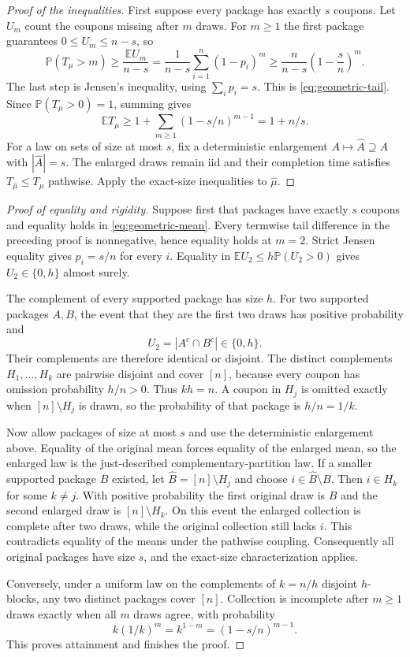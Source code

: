 \documentclass[11pt]{article}
\numberwithin{equation}{section}
\theoremstyle{remark}
\newcommand{\Pp}{\mathbb P}
\newcommand{\E}{\mathbb E}
\newcommand{\1}{\mathbf 1}
\begin{document}
\begin{proof}[Proof of the inequalities]
First suppose every package has exactly $s$ coupons. Let $U_m$ count the coupons missing after $m$ draws. For $m\geq1$ the first package guarantees $0\leq U_m\leq n-s$, so
\[
 \Pp(T_\mu>m)\geq\frac{\E U_m}{n-s}
 =\frac1{n-s}\sum_{i=1}^n(1-p_i)^m
 \geq\frac n{n-s}\left(1-\frac sn\right)^m.
\]
The last step is Jensen's inequality, using $\sum_i p_i=s$. This is \eqref{eq:geometric-tail}. Since $\Pp(T_\mu>0)=1$, summing gives
\[
 \E T_\mu\geq1+\sum_{m\geq1}(1-s/n)^{m-1}=1+n/s.
\]
For a law on sets of size at most $s$, fix a deterministic enlargement $A\mapsto\widehat A\supseteq A$ with $|\widehat A|=s$. The enlarged draws remain iid and their completion time satisfies $T_{\widehat\mu}\leq T_\mu$ pathwise. Apply the exact-size inequalities to $\widehat\mu$.
\end{proof}

\begin{proof}[Proof of equality and rigidity]
Suppose first that packages have exactly $s$ coupons and equality holds in \eqref{eq:geometric-mean}. Every termwise tail difference in the preceding proof is nonnegative, hence equality holds at $m=2$. Strict Jensen equality gives $p_i=s/n$ for every $i$. Equality in $\E U_2\leq h\Pp(U_2>0)$ gives $U_2\in\{0,h\}$ almost surely.

The complement of every supported package has size $h$. For two supported packages $A,B$, the event that they are the first two draws has positive probability and
\[
 U_2=|A^c\cap B^c|\in\{0,h\}.
\]
Their complements are therefore identical or disjoint. The distinct complements $H_1,\ldots,H_k$ are pairwise disjoint and cover $[n]$, because every coupon has omission probability $h/n>0$. Thus $kh=n$. A coupon in $H_j$ is omitted exactly when $[n]\setminus H_j$ is drawn, so the probability of that package is $h/n=1/k$.

Now allow packages of size at most $s$ and use the deterministic enlargement above. Equality of the original mean forces equality of the enlarged mean, so the enlarged law is the just-described complementary-partition law. If a smaller supported package $B$ existed, let $\widehat B=[n]\setminus H_j$ and choose $i\in\widehat B\setminus B$. Then $i\in H_k$ for some $k\ne j$. With positive probability the first original draw is $B$ and the second enlarged draw is $[n]\setminus H_k$. On this event the enlarged collection is complete after two draws, while the original collection still lacks $i$. This contradicts equality of the means under the pathwise coupling. Consequently all original packages have size $s$, and the exact-size characterization applies.

Conversely, under a uniform law on the complements of $k=n/h$ disjoint $h$-blocks, any two distinct packages cover $[n]$. Collection is incomplete after $m\geq1$ draws exactly when all $m$ draws agree, with probability
\[
 k(1/k)^m=k^{1-m}=(1-s/n)^{m-1}.
\]
This proves attainment and finishes the proof.
\end{proof}
\end{document}
